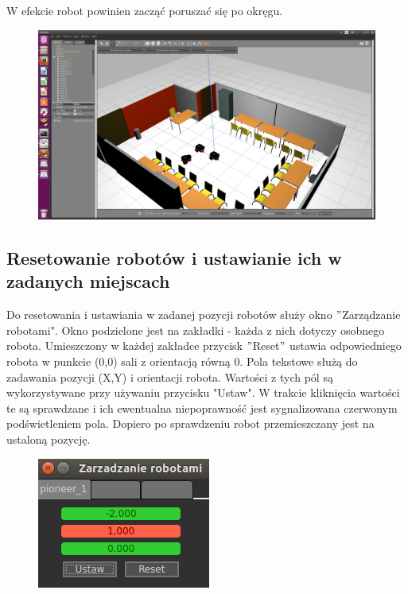 \documentclass[10pt, a4paper]{article}
\begin{document}
W efekcie robot powinien zacząć poruszać się po okręgu.

\begin{figure}[hbt]
  \setlength{\unitlength}{1.0cm}
  \centering 
  
    \includegraphics[width=12 cm]{./grafika/EkranGlownyZSalaIRobotami.png}

\end{figure}

 \subsection{Resetowanie robotów i ustawianie ich w zadanych miejscach}

Do resetowania i ustawiania w zadanej pozycji robotów służy okno $"$Zarządzanie robotami". Okno podzielone jest na zakładki - każda z nich dotyczy osobnego robota. Umieszczony w każdej zakładce przycisk $"$Reset$"$ ustawia odpowiedniego robota w punkcie (0,0) sali z orientacją równą 0. Pola tekstowe służą do zadawania pozycji (X,Y) i orientacji robota. Wartości z tych pól są wykorzystywane przy używaniu przycisku "Ustaw". W trakcie kliknięcia wartości te są sprawdzane i ich ewentualna niepoprawność jest sygnalizowana czerwonym podświetleniem pola. Dopiero po sprawdzeniu robot przemieszczany jest na ustaloną pozycję.
\begin{figure}[hbt]
  \setlength{\unitlength}{1.0cm}
  \centering 
  
    \includegraphics[width=6 cm]{./grafika/OknoZarzadzaniaRobotami.png}

\end{figure}
\end{document}
